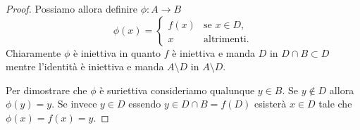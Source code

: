 \begin{proof}
Possiamo allora definire $\phi \colon A \to B$
\[
\phi(x) =
\begin{cases}
   f(x) & \text{se $x\in D$}, \\
   x & \text{altrimenti.}
\end{cases}
\]
Chiaramente $\phi$ è iniettiva in quanto $f$ è iniettiva e manda $D$ in $D\cap B \subset D$
mentre l'identità è iniettiva e manda $A\setminus D$ in $A\setminus D$.

Per dimostrare che $\phi$ è suriettiva consideriamo qualunque $y \in B$.
Se $y\not \in D$ allora $\phi(y)=y$.
Se invece $y\in D$ essendo $y\in D\cap B = f(D)$ esisterà $x\in D$ tale
che $\phi(x) = f(x) = y$.
\end{proof}


